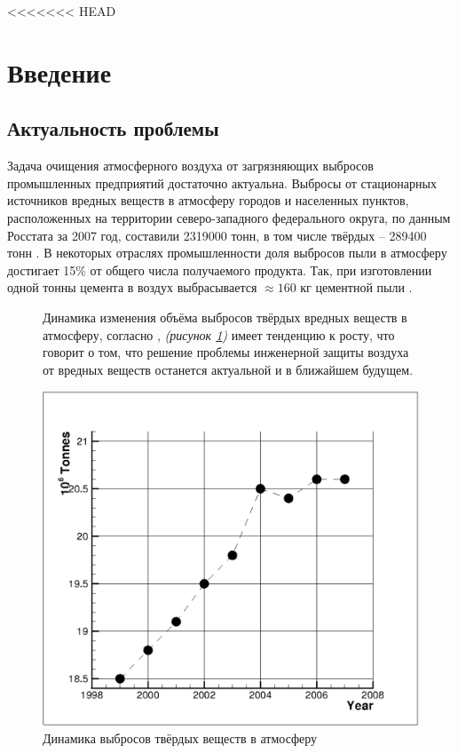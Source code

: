 <<<<<<< HEAD
\section*{Введение}
	\subsection*{Актуальность проблемы}
		Задача очищения атмосферного воздуха от загрязняющих выбросов промышленных предприятий достаточно актуальна. Выбросы от стационарных источников вредных веществ в атмосферу городов и населенных пунктов, расположенных на территории северо-западного федерального округа,  по данным Росстата за 2007 год,  составили 2319000 тонн, в том числе твёрдых -- 289400 тонн \cite{emissionInfoRussian}. В некоторых отраслях промышленности доля выбросов пыли в атмосферу достигает 15\% от общего числа получаемого продукта. Так, при изготовлении одной тонны цемента в воздух выбрасывается $\approx 160$ кг цементной пыли \cite{emissionInfoEurope}.
		\begin{figure}[ht]
			\begin{minipage}{0.46\linewidth}
				Динамика изменения объёма выбросов твёрдых вредных веществ в атмосферу, согласно \cite{emissionInfoRussian}, \textit{(рисунок \ref{figure:atmosphereDynamic})} имеет тенденцию к росту, что говорит о том, что решение проблемы инженерной защиты воздуха от вредных веществ останется актуальной и в ближайшем будущем. 
			\end{minipage}
			\hspace{0.01\linewidth}
			\begin{minipage}{0.48\linewidth}
				\centering
				\includegraphics[scale=0.28]{atmosphereDynamic1}
				\caption{Динамика выбросов твёрдых веществ в атмосферу}
				\label{figure:atmosphereDynamic}
			\end{minipage}
		\end{figure}
		\vspace{-1em}
	
